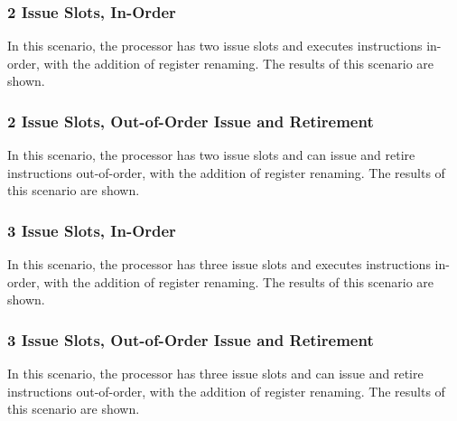 \documentclass{article}
\begin{document}
\subsubsection{2 Issue Slots, In-Order}
In this scenario, the processor has two issue slots and executes instructions in-order, with the addition of register renaming. The results of this scenario are shown.
\subsubsection{2 Issue Slots, Out-of-Order Issue and Retirement}
In this scenario, the processor has two issue slots and can issue and retire instructions out-of-order, with the addition of register renaming. The results of this scenario are shown.
\subsubsection{3 Issue Slots, In-Order}
In this scenario, the processor has three issue slots and executes instructions in-order, with the addition of register renaming. The results of this scenario are shown.
\subsubsection{3 Issue Slots, Out-of-Order Issue and Retirement}
In this scenario, the processor has three issue slots and can issue and retire instructions out-of-order, with the addition of register renaming. The results of this scenario are shown.
\end{document}
